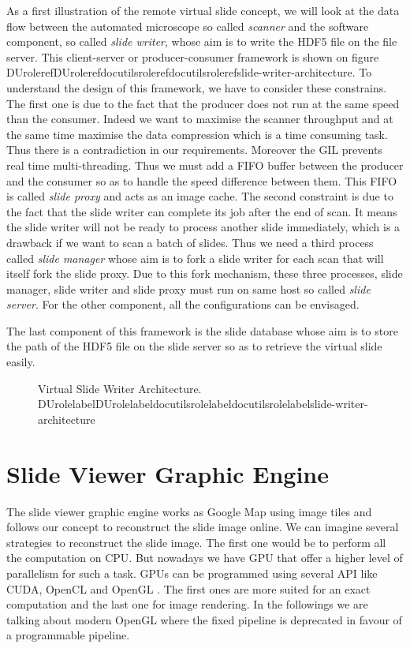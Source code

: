 \documentclass[letterpaper,compsoc,twoside]{IEEEtran}
\providecommand*{\DUrole}[2]{\ifcsname DUrole#1\endcsname \csname DUrole#1\endcsname{#2}\else \ifcsname docutilsrole#1\endcsname \csname docutilsrole#1\endcsname{#2}\else #2\fi \fi }
\begin{document}
As a first illustration of the remote virtual slide concept, we will look at the data flow between
the automated microscope so called \emph{scanner} and the software component, so called \emph{slide writer},
whose aim is to write the HDF5 file on the file server. This client-server or producer-consumer framework is
shown on figure \DUrole{ref}{slide-writer-architecture}. To understand the design of this framework, we
have to consider these constrains. The first one is due to the fact that the producer does not run
at the same speed than the consumer. Indeed we want to maximise the scanner throughput and at the
same time maximise the data compression which is a time consuming task. Thus there is a
contradiction in our requirements. Moreover the GIL prevents real time multi-threading. Thus we must
add a FIFO buffer between the producer and the consumer so as to handle the speed difference
between them. This FIFO is called \emph{slide proxy} and acts as an image cache. The second constraint is
due to the fact that the slide writer can complete its job after the end of scan. It means the
slide writer will not be ready to process another slide immediately, which is a drawback if we want
to scan a batch of slides. Thus we need a third process called \emph{slide manager} whose aim is to fork
a slide writer for each scan that will itself fork the slide proxy. Due to this fork mechanism, these
three processes, slide manager, slide writer and slide proxy must run on same host so called \emph{slide
server}. For the other component, all the configurations can be envisaged.

The last component of this framework is the slide database whose aim is to store the path of the
HDF5 file on the slide server so as to retrieve the virtual slide easily.\begin{figure}[bht]\noindent{}
\caption{Virtual Slide Writer Architecture. \DUrole{label}{slide-writer-architecture}}
\end{figure}

\section{Slide Viewer Graphic Engine\label{slide-viewer-graphic-engine}}


The slide viewer graphic engine works as Google Map using image tiles and follows our concept to
reconstruct the slide image online. We can imagine several strategies to reconstruct the slide
image. The first one would be to perform all the computation on CPU. But nowadays we have GPU that
offer a higher level of parallelism for such a task. GPUs can be programmed using several API like
CUDA, OpenCL and OpenGL \cite{OpenGL}. The first ones are more suited for an exact computation and the
last one for image rendering. In the followings we are talking about modern OpenGL where the fixed
pipeline is deprecated in favour of a programmable pipeline.
\end{document}
